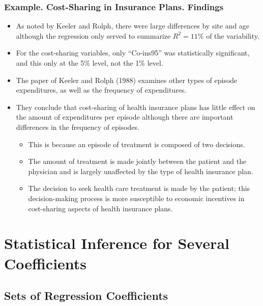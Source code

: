 \begin{frame}[shrink=5]
 \frametitle{Example. Cost-Sharing in Insurance Plans. Findings}
\begin{itemize}
\item
As noted by Keeler and Rolph, there were large differences by site
and age although the regression only served to summarize $R^2=11\%$
of the variability.
\item For the cost-sharing variables, only
``Co-ins95'' was statistically significant, and this only at the 5\%
level, not the 1\% level.
\item
The paper of Keeler and Rolph (1988) examines other types of episode
expenditures, as well as the frequency of expenditures.
\item They
conclude that cost-sharing of health insurance plans has little
effect on the amount of expenditures per episode although there are
important differences in the frequency of episodes.
\begin{itemize}
\item This is because
an episode of treatment is composed of two decisions.
\item The amount of
treatment is made jointly between the patient and the physician and
is largely unaffected by the type of health insurance plan.
\item The
decision to seek health care treatment is made by the patient; this
decision-making process is more susceptible to economic incentives
in cost-sharing aspects of health insurance plans.
  \end{itemize}
  \end{itemize}
\end{frame}




\section{Statistical Inference for Several Coefficients}

\subsection{Sets of Regression Coefficients}

